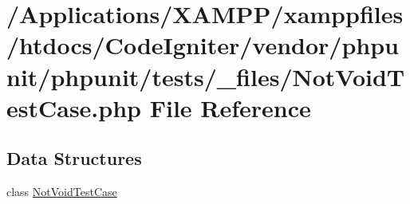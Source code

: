 \hypertarget{_not_void_test_case_8php}{}\section{/\+Applications/\+X\+A\+M\+P\+P/xamppfiles/htdocs/\+Code\+Igniter/vendor/phpunit/phpunit/tests/\+\_\+files/\+Not\+Void\+Test\+Case.php File Reference}
\label{_not_void_test_case_8php}
\subsection*{Data Structures}
\begin{DoxyCompactItemize}
\item 
class \mbox{\hyperlink{class_not_void_test_case}{Not\+Void\+Test\+Case}}
\end{DoxyCompactItemize}
